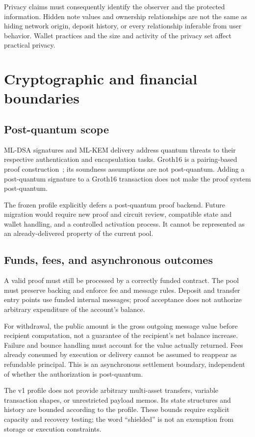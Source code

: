 \documentclass[11pt,a4paper]{article}
\begin{document}
Privacy claims must consequently identify the observer and the protected
information. Hidden note values and ownership relationships are not the same
as hiding network origin, deposit history, or every relationship inferable
from user behavior. Wallet practices and the size and activity of the privacy
set affect practical privacy.

\section{Cryptographic and financial boundaries}
\subsection{Post-quantum scope}
ML-DSA signatures and ML-KEM delivery address quantum threats to their
respective authentication and encapsulation tasks. Groth16 is a pairing-based
proof construction~\cite{groth16}; its soundness assumptions are not
post-quantum. Adding a post-quantum signature to a Groth16 transaction does
not make the proof system post-quantum.

The frozen profile explicitly defers a post-quantum proof backend. Future
migration would require new proof and circuit review, compatible state and
wallet handling, and a controlled activation process. It cannot be represented
as an already-delivered property of the current pool.

\subsection{Funds, fees, and asynchronous outcomes}
A valid proof must still be processed by a correctly funded contract. The
pool must preserve backing and enforce fee and message rules. Deposit and
transfer entry points use funded internal messages; proof acceptance does
not authorize arbitrary expenditure of the account's balance.

For withdrawal, the public amount is the gross outgoing message value before
recipient computation, not a guarantee of the recipient's net balance
increase. Failure and bounce handling must account for the value actually
returned. Fees already consumed by execution or delivery cannot be assumed
to reappear as refundable principal. This is an asynchronous settlement
boundary, independent of whether the authorization is post-quantum.

The v1 profile does not provide arbitrary multi-asset transfers, variable
transaction shapes, or unrestricted payload memos. Its state structures and
history are bounded according to the profile. These bounds require explicit
capacity and recovery testing; the word ``shielded'' is not an exemption
from storage or execution constraints.
\end{document}
